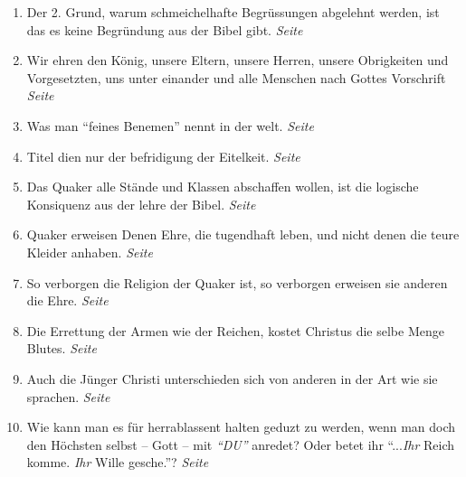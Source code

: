 \begin{enumerate}
 \item Der 2. Grund, warum schmeichelhafte Begrüssungen abgelehnt werden, ist
das es keine Begründung aus der Bibel gibt.
 \dotfill \textit{Seite \pageref{ref:09_20_zeiter_grund}}\\
 
 \item Wir ehren den König, unsere Eltern,
unsere Herren, unsere Obrigkeiten
und Vorgesetzten, uns unter einander und alle
Menschen nach Gottes Vorschrift
 \dotfill \textit{Seite \pageref{ref:09_20_koenig}}\\
 
 \item Was man "`feines Benemen"' nennt in der welt.
 \dotfill \textit{Seite \pageref{ref:09_26_feines_benemen}}\\
 
 \item Titel dien nur der befridigung der Eitelkeit.
 \dotfill \textit{Seite \pageref{ref:09_31_heuchelei}}\\
 
 \item Das Quaker alle Stände und Klassen abschaffen wollen, ist die logische
Konsiquenz aus der lehre der Bibel.
 \dotfill \textit{Seite
\pageref{ref:09_35_staende_abschaffen}}\\

 \item Quaker erweisen Denen Ehre, die tugendhaft leben, und nicht denen die
teure Kleider anhaben.
 \dotfill \textit{Seite \pageref{ref:09_36_ehre_erweisen}}\\
 
 \item So verborgen die Religion der Quaker ist, so verborgen erweisen sie
anderen die Ehre.
 \dotfill \textit{Seite \pageref{ref:09_37_ehre_erweisen}}\\
 
 \item Die Errettung der Armen wie der Reichen, kostet Christus die selbe Menge
Blutes.
 \dotfill \textit{Seite \pageref{ref:09_39_erettung}}\\
 
 \item Auch die Jünger Christi unterschieden sich von anderen in der Art wie sie
sprachen.
 \dotfill \textit{Seite \pageref{ref:10_08_sprache}}\\
 
 \item Wie kann man es für herrablassent halten geduzt zu werden, wenn man doch
den Höchsten selbst -- Gott -- mit \textit{"`DU"'} anredet? Oder betet ihr
"`...\textit{Ihr} Reich komme. \textit{Ihr} Wille gesche."'?
 \dotfill \textit{Seite \pageref{ref:10_08_duzen}}\\
 

\end{enumerate}
